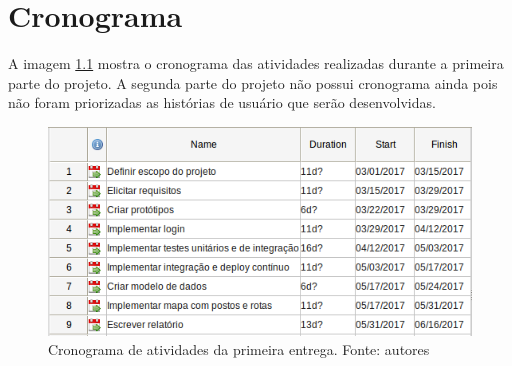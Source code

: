 \chapter[Cronograma]{Cronograma}
\label{chap:crono}

A imagem \ref{img:cronograma} mostra o cronograma das atividades realizadas durante a primeira parte do projeto. A segunda parte do projeto não possui cronograma ainda pois não foram priorizadas as histórias de usuário que serão desenvolvidas.

\begin{figure}[H]
    \centering
    \includegraphics[scale=0.5]{figuras/cronograma_r1.png}
    \caption[Cronograma de atividades da primeira entrega.]{Cronograma de atividades da primeira entrega. Fonte: autores}
    \label{img:cronograma}
\end{figure}
